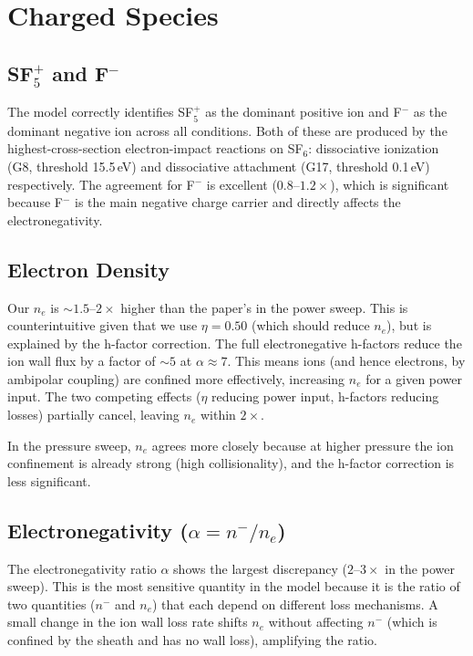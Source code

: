 \documentclass[11pt,a4paper]{article}
\begin{document}
\section{Charged Species}

\subsection{SF$_5^+$ and F$^-$}

The model correctly identifies SF$_5^+$ as the dominant positive ion and F$^-$ as the dominant negative ion across all conditions. Both of these are produced by the highest-cross-section electron-impact reactions on SF$_6$: dissociative ionization (G8, threshold 15.5\,eV) and dissociative attachment (G17, threshold 0.1\,eV) respectively. The agreement for F$^-$ is excellent ($0.8$--$1.2\times$), which is significant because F$^-$ is the main negative charge carrier and directly affects the electronegativity.

\subsection{Electron Density}

Our $n_e$ is ${\sim}1.5$--$2\times$ higher than the paper's in the power sweep. This is counterintuitive given that we use $\eta = 0.50$ (which should reduce $n_e$), but is explained by the h-factor correction. The full electronegative h-factors reduce the ion wall flux by a factor of ${\sim}5$ at $\alpha \approx 7$. This means ions (and hence electrons, by ambipolar coupling) are confined more effectively, increasing $n_e$ for a given power input. The two competing effects ($\eta$ reducing power input, h-factors reducing losses) partially cancel, leaving $n_e$ within $2\times$.

In the pressure sweep, $n_e$ agrees more closely because at higher pressure the ion confinement is already strong (high collisionality), and the h-factor correction is less significant.

\subsection{Electronegativity ($\alpha = n^-/n_e$)}

The electronegativity ratio $\alpha$ shows the largest discrepancy ($2$--$3\times$ in the power sweep). This is the most sensitive quantity in the model because it is the ratio of two quantities ($n^-$ and $n_e$) that each depend on different loss mechanisms. A small change in the ion wall loss rate shifts $n_e$ without affecting $n^-$ (which is confined by the sheath and has no wall loss), amplifying the ratio.
\end{document}

